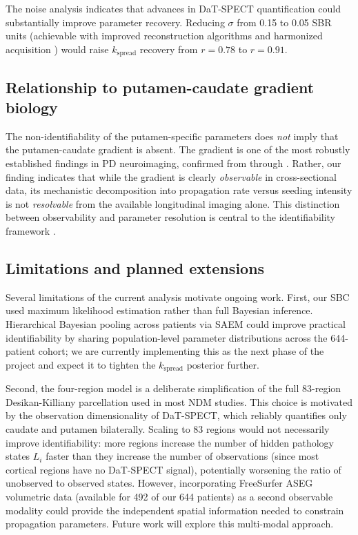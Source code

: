 The noise analysis indicates that advances in DaT-SPECT quantification could substantially improve parameter recovery. Reducing $\sigma$ from 0.15 to 0.05 SBR units (achievable with improved reconstruction algorithms and harmonized acquisition \cite{tossicibolt2017}) would raise $k_{\text{spread}}$ recovery from $r = 0.78$ to $r = 0.91$.

\subsection{Relationship to putamen-caudate gradient biology}

The non-identifiability of the putamen-specific parameters does \textit{not} imply that the putamen-caudate gradient is absent. The gradient is one of the most robustly established findings in PD neuroimaging, confirmed from \cite{brooks1990} through \cite{fiorenzato2021}. Rather, our finding indicates that while the gradient is clearly \textit{observable} in cross-sectional data, its mechanistic decomposition into propagation rate versus seeding intensity is not \textit{resolvable} from the available longitudinal imaging alone. This distinction between observability and parameter resolution is central to the identifiability framework \cite{villaverde2016}.

\subsection{Limitations and planned extensions}

Several limitations of the current analysis motivate ongoing work. First, our SBC used maximum likelihood estimation rather than full Bayesian inference. Hierarchical Bayesian pooling across patients via SAEM \cite{schafer2021} could improve practical identifiability by sharing population-level parameter distributions across the 644-patient cohort; we are currently implementing this as the next phase of the project and expect it to tighten the $k_{\text{spread}}$ posterior further.

Second, the four-region model is a deliberate simplification of the full 83-region Desikan-Killiany parcellation used in most NDM studies. This choice is motivated by the observation dimensionality of DaT-SPECT, which reliably quantifies only caudate and putamen bilaterally. Scaling to 83 regions would not necessarily improve identifiability: more regions increase the number of hidden pathology states $L_i$ faster than they increase the number of observations (since most cortical regions have no DaT-SPECT signal), potentially worsening the ratio of unobserved to observed states. However, incorporating FreeSurfer ASEG volumetric data (available for 492 of our 644 patients) as a second observable modality could provide the independent spatial information needed to constrain propagation parameters. Future work will explore this multi-modal approach.

